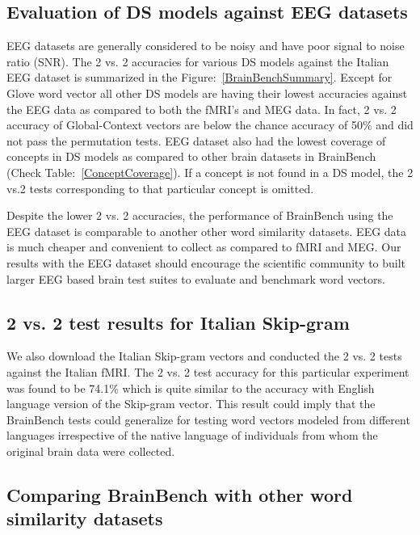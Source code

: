 \subsection{Evaluation of DS models against EEG datasets }
EEG datasets are generally considered to be noisy and have poor signal to noise ratio (SNR). The 2 vs. 2 accuracies for various DS models against the Italian EEG dataset is summarized in the Figure:~\ref{BrainBenchSummary}. Except for Glove word vector all other DS models are having their lowest accuracies against the EEG data as compared to both the fMRI's and MEG data. In fact, 2 vs. 2 accuracy of Global-Context vectors are below the chance accuracy of 50\% and did not pass the permutation tests. EEG dataset also had the lowest coverage of concepts in DS models as compared to other brain datasets in BrainBench (Check Table:~\ref{ConceptCoverage}). If a concept is not found in a DS model, the 2 vs.2 tests corresponding to that particular concept is omitted. 

Despite the lower 2 vs. 2 accuracies, the performance of BrainBench using the EEG dataset is comparable to another other word similarity datasets. EEG data is much cheaper and convenient to collect as compared to fMRI and MEG. Our results with the EEG dataset should encourage the scientific community to built larger EEG based brain test suites to evaluate and benchmark word vectors.

\subsection{2 vs. 2 test results for Italian Skip-gram}
We also download the Italian Skip-gram vectors and conducted the 2 vs. 2 tests against the Italian fMRI. The 2 vs. 2 test accuracy for this particular experiment was found to be 74.1\% which is quite similar to the accuracy with English language version of the Skip-gram vector. This result could imply that the BrainBench tests could generalize for testing word vectors modeled from different languages irrespective of the native language of individuals from whom the original brain data were collected.


\subsection{Comparing BrainBench with other word similarity datasets}


